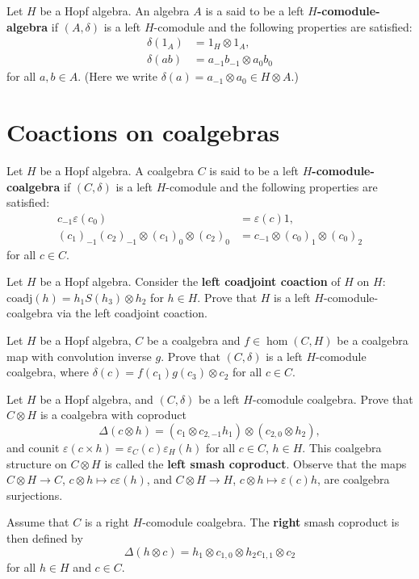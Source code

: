 \begin{definition}
Let $H$ be a Hopf algebra. An algebra $A$ is a said to be a left
\textbf{$H$-comodule-algebra} if $(A,\delta)$ is a left $H$-comodule and the
following properties are satisfied:
\begin{align*}
\delta(1_{A}) & =1_{H}\otimes1_{A},\\
\delta(ab) & =a_{-1}b_{-1}\otimes a_{0}b_{0}
\end{align*}
for all $a,b\in A$. (Here we write $\delta(a)=a_{-1}\otimes a_{0}\in H\otimes A$.)
\end{definition}

\section{Coactions on coalgebras}

\begin{definition}
Let $H$ be a Hopf algebra. A coalgebra $C$ is said to be a left
\textbf{$H$-comodule-coalgebra} if $(C,\delta)$ is a left $H$-comodule and
the following properties are satisfied:
\begin{align*}
c_{-1}\varepsilon(c_{0}) & =\varepsilon(c)1,\\
(c_{1})_{-1}(c_{2})_{-1}\otimes(c_{1})_{0}\otimes(c_{2})_{0} & =c_{-1}\otimes(c_{0})_{1}\otimes(c_{0})_{2}
\end{align*}
for all $c\in C$.
\end{definition}

\begin{exercise}
Let $H$ be a Hopf algebra. Consider the \textbf{left coadjoint coaction}
of $H$ on $H$: $\mathrm{coadj}(h)=h_{1}S(h_{3})\otimes h_{2}$ for $h\in H$. Prove that 
$H$ is a left $H$-comodule-coalgebra via the left coadjoint coaction.
\end{exercise}

\begin{exercise}
Let $H$ be a Hopf algebra, $C$ be a coalgebra and $f\in\hom(C,H)$
be a coalgebra map with convolution inverse $g$. Prove that $(C,\delta)$
is a left $H$-comodule coalgebra, where $\delta(c)=f(c_{1})g(c_{3})\otimes c_{2}$
for all $c\in C$. 
\end{exercise}

\begin{exercise}
\label{exercise:smash_coleft}
Let $H$ be a Hopf algebra, and $(C,\delta)$ be a left $H$-comodule
coalgebra. Prove that $C\otimes H$ is a coalgebra with coproduct
\[
\Delta(c\otimes h)=\left(c_{1}\otimes c_{2,-1}h_{1}\right)\otimes\left(c_{2,0}\otimes h_{2}\right),
\]
and counit $\varepsilon(c\times h)=\varepsilon_{C}(c)\varepsilon_{H}(h)$ for
all $c\in C$, $h\in H$. This coalgebra structure on $C\otimes H$ is called the
\textbf{left smash coproduct}. Observe that the maps $C\otimes H\to C$,
$c\otimes h\mapsto c\varepsilon(h)$, and $C\otimes H\to H$, $c\otimes h\mapsto
\varepsilon(c)h$, are coalgebra surjections.
\end{exercise}

Assume that $C$ is a right $H$-comodule coalgebra. The \textbf{right}
smash coproduct is then defined by 
\[
\Delta(h\otimes c)=h_{1}\otimes c_{1,0}\otimes h_{2}c_{1,1}\otimes c_{2}
\]
for all $h\in H$ and $c\in C$.

